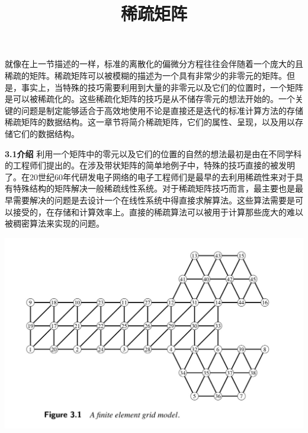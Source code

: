 \documentclass{article}
\begin{document}
  

\title{稀疏矩阵}
\date{}

\maketitle



就像在上一节描述的一样，标准的离散化的偏微分方程往往会伴随着一个庞大的且稀疏的矩阵。稀疏矩阵可以被模糊的描述为一个具有非常少的非零元的矩阵。但是，事实上，当特殊的技巧需要利用到大量的非零元以及它们的位置时，一个矩阵是可以被稀疏化的。这些稀疏化矩阵的技巧是从不储存零元的想法开始的。一个关键的问题是制定能够适合于高效地使用不论是直接还是迭代的标准计算方法的存储稀疏矩阵的数据结构。这一章节将简介稀疏矩阵，它们的属性、呈现，以及用以存储它们的数据结构。
\newline\newline

\textbf{3.1介绍}
\newline\newline
利用一个矩阵中的零元以及它们的位置的自然的想法最初是由在不同学科的工程师们提出的。在涉及带状矩阵的简单地例子中，特殊的技巧直接的被发明了。在20世纪60年代研发电子网络的电子工程师们是最早的去利用稀疏性来对于具有特殊结构的矩阵解决一般稀疏线性系统。对于稀疏矩阵技巧而言，最主要也是最早需要解决的问题是去设计一个在线性系统中得直接求解算法。这些算法需要是可以接受的，在存储和计算效率上。直接的稀疏算法可以被用于计算那些庞大的难以被稠密算法来实现的问题。
\newline\newline\newline\newline\newline\newline\newline\newline

\includegraphics[scale=0.25]{3_1.png}
\end{document}
